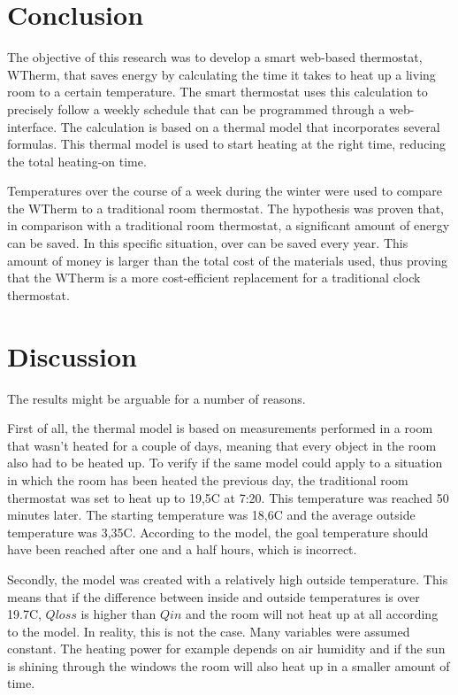 \documentclass[12pt,a4paper,final]{report}
\begin{document}
\part{Conclusion}
The objective of this research was to develop a smart web-based thermostat, WTherm, that saves energy by calculating the time it takes to heat up a living room to a certain temperature. The smart thermostat uses this calculation to precisely follow a weekly schedule that can be programmed through a web-interface. The calculation is based on a thermal model that incorporates several formulas. This thermal model is used to start heating at the right time, reducing the total heating-on time.

Temperatures over the course of a week during the winter were used to compare the WTherm to a traditional room thermostat. The hypothesis was proven that, in comparison with a traditional room thermostat, a significant amount of energy can be saved. In this specific situation, over  can be saved every year. This amount of money is larger than the total cost of the materials used, thus proving that the WTherm is a more cost-efficient replacement for a traditional clock thermostat.

\part{Discussion}
The results might be arguable for a number of reasons.

First of all, the thermal model is based on measurements performed in a room that wasn't heated for a couple of days, meaning that every object in the room also had to be heated up. To verify if the same model could apply to a situation in which the room has been heated the previous day, the traditional room thermostat was set to heat up to 19,5\degree{}C at 7:20. This temperature was reached 50 minutes later. The starting temperature was 18,6\degree{}C and the average outside temperature was 3,35\degree{}C. According to the model, the goal temperature should have been reached after one and a half hours, which is incorrect.

Secondly, the model was created with a relatively high outside temperature. This means that if the difference between inside and outside temperatures is over 19.7\degree{}C, $Qloss$ is higher than $Qin$ and the room will not heat up at all according to the model. In reality, this is not the case. Many variables were assumed constant. The heating power for example depends on air humidity and if the sun is shining through the windows the room will also heat up in a smaller amount of time.
\end{document}

